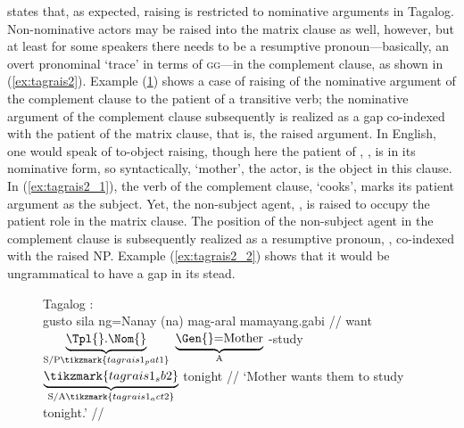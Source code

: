 \citet[27--28]{kroeger1991} states that, as expected, raising is restricted to
nominative arguments in Tagalog. Non-nominative actors may be raised into the
matrix clause as well, however, but at least for some speakers there needs to
be a resumptive pronoun---basically, an overt pronominal `trace' in terms of
\textsc{gg}---in the complement clause, as shown in (\ref{ex:tagrais2}).
Example (\ref{ex:tagrais1}) shows a case of raising of the nominative argument
of the complement clause to the patient of a transitive verb; the nominative
argument of the complement clause subsequently is realized as a gap co-indexed
with the patient of the matrix clause, that is, the raised argument. In
English, one would speak of to-object raising, though here the patient of
, , is in its nominative form, so syntactically,  `mother', the actor, is the object in this clause. In
(\ref{ex:tagrais2_1}), the verb of the complement clause,  `cooks',
marks its patient argument as the subject. Yet, the non-subject agent,
, is raised to occupy the patient role in the matrix clause. The
position of the non-subject agent in the complement clause is subsequently
realized as a resumptive pronoun, , co-indexed with the raised NP.
Example (\ref{ex:tagrais2_2}) shows that it would be ungrammatical to have a
gap in its stead.

\begin{figure}[h]
\ex\label{ex:tagrais1}%
Tagalog \parencite[adapted from][26]{kroeger1991}:\medskip \\
\begingl[aboveglbskip=1.5em, aboveglftskip=1.75em]
	\gla gusto sila ng=Nanay (na) mag-aral {} mamayang.gabi //
	\glb want
		$\underbrace{\text{\smash{\Tpl{}}.\Nom{}}}_{\text{S/P}%
			\tikzmark{tagrais1_pat1}%
		}$
		$\underbrace{\text{\Gen{}=Mother}}_{\text{A}}$
		\Comp{}
		\Av{}-study%
		$\underbrace{%
			\tikzmark{tagrais1_sb2}%
		}_{\text{S/A}%
			\tikzmark{tagrais1_act2}%
		}$
		tonight
		//
	\glft `Mother wants them to study tonight.' //
\endgl
{}
\xe
\end{figure}

